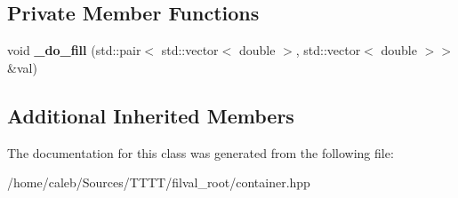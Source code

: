 \subsection*{Private Member Functions}
\begin{DoxyCompactItemize}
\item 
\hypertarget{classfv_1_1root_1_1ContainerTH2DMany_a94e7713ed35518d23ac7608c1119caed}{}\label{classfv_1_1root_1_1ContainerTH2DMany_a94e7713ed35518d23ac7608c1119caed} 
void {\bfseries \+\_\+do\+\_\+fill} (std\+::pair$<$ std\+::vector$<$ double $>$, std\+::vector$<$ double $>$$>$ \&val)
\end{DoxyCompactItemize}
\subsection*{Additional Inherited Members}


The documentation for this class was generated from the following file\+:\begin{DoxyCompactItemize}
\item 
/home/caleb/\+Sources/\+T\+T\+T\+T/filval\+\_\+root/container.\+hpp\end{DoxyCompactItemize}
